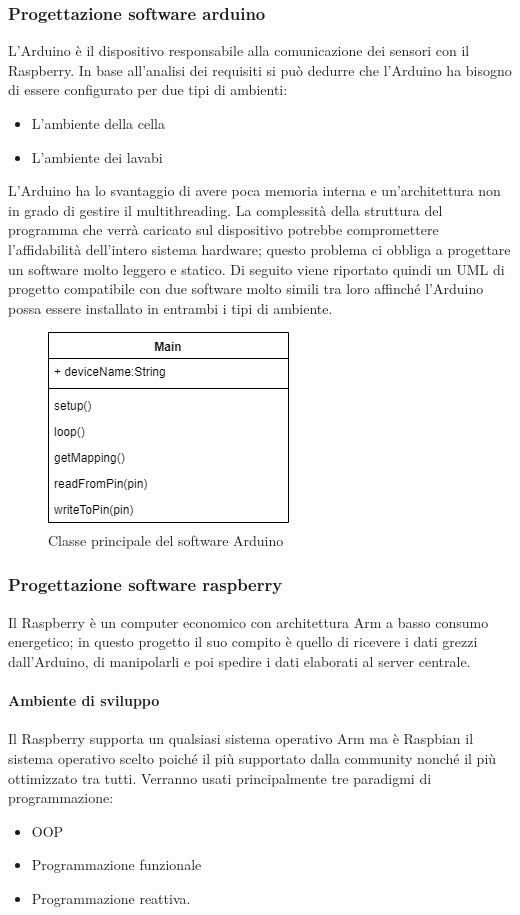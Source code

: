 \documentclass[12pt]{article}
\begin{document}
\subsubsection{Progettazione software arduino}
L'Arduino è il dispositivo responsabile alla comunicazione dei sensori con il Raspberry.
In base all'analisi dei requisiti si può dedurre che l'Arduino ha bisogno di essere configurato per due tipi di ambienti:
\begin{itemize}
\item L'ambiente della cella
\item L'ambiente dei lavabi
\end{itemize}
L'Arduino ha lo svantaggio di avere poca memoria interna e un'architettura non in grado di gestire il multithreading. La complessità della struttura del programma che verrà caricato sul dispositivo potrebbe compromettere l'affidabilità dell'intero sistema hardware; questo problema ci obbliga a progettare un software molto leggero e statico.
Di seguito viene riportato quindi un UML di progetto compatibile con due software molto simili tra loro affinché l'Arduino possa essere installato in entrambi i tipi di ambiente. 
\begin{figure}[h!]
\centering
	\includegraphics[scale=0.55]{img/parteLocale/SoftwareArduino.png}  
    \caption{Classe principale del software Arduino}
\end{figure}
\subsubsection{Progettazione software raspberry}
Il Raspberry è un computer economico con architettura Arm a basso consumo energetico; in questo progetto il suo compito è quello di ricevere i dati grezzi dall'Arduino, di manipolarli e poi spedire i dati elaborati al server centrale.
\paragraph{Ambiente di sviluppo}
Il Raspberry supporta un qualsiasi sistema operativo Arm ma è Raspbian il sistema operativo scelto poiché il più supportato dalla community nonché il più ottimizzato tra tutti. Verranno usati principalmente tre paradigmi di programmazione: 
\begin{itemize}
\item OOP
\item Programmazione funzionale 
\item Programmazione reattiva. 
\newpage
\end{itemize}
\end{document}
